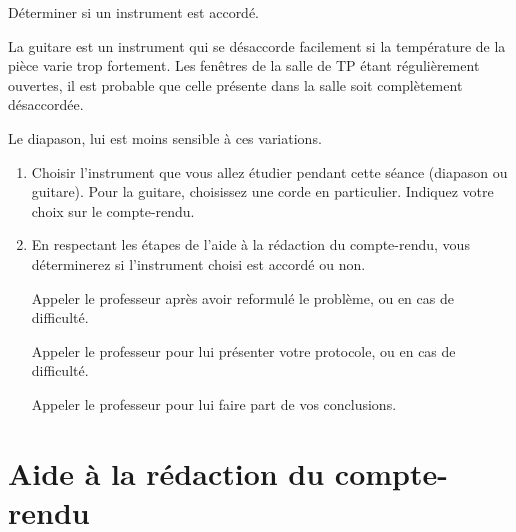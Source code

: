 \documentclass[12pt,a4paper]{article}
\begin{document}
\newpage

\begin{objectif}
Déterminer si un instrument est accordé.
\end{objectif}

La guitare est un instrument qui se désaccorde facilement si la température de la pièce varie trop fortement.
Les fenêtres de la salle de TP étant régulièrement ouvertes, il est probable que celle présente dans la salle soit complètement désaccordée.

Le diapason, lui est moins sensible à ces variations.

\begin{enumerate}
\item Choisir l'instrument que vous allez étudier pendant cette séance (diapason ou guitare).
Pour la guitare, choisissez une corde en particulier.
Indiquez votre choix sur le compte-rendu.

\item \app{} \anarai{} \rea{} \val{} \com{}

En respectant les étapes de l'aide à la rédaction du compte-rendu, vous déterminerez si l'instrument choisi est accordé ou non.

Appeler le professeur après avoir reformulé le problème, ou en cas de difficulté.
\appelprof{\app}

Appeler le professeur pour lui présenter votre protocole, ou en cas de difficulté.
\appelprof{\anarai}

Appeler le professeur pour lui faire part de vos conclusions.
\appelprof{}

\end{enumerate}

\section*{Aide à la rédaction du compte-rendu}
\end{document}

